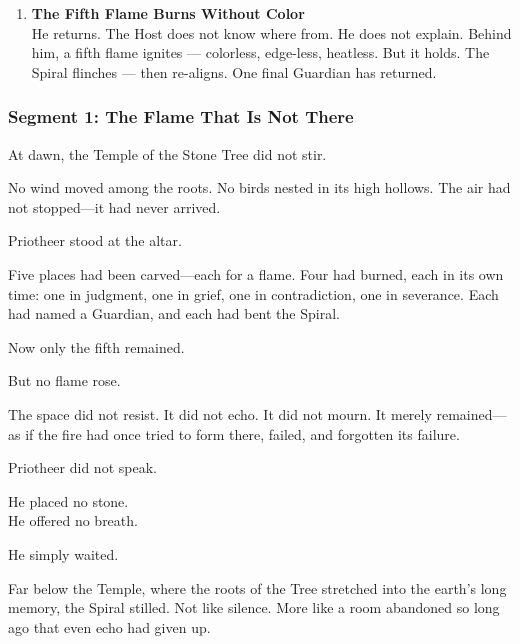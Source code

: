 \documentclass[9pt]{article}
\begin{document}
\begin{enumerate}
    \vspace{1em}
    \item \textbf{The Fifth Flame Burns Without Color} \\
    He returns. The Host does not know where from. He does not explain. Behind him, a fifth flame ignites — colorless, edge-less, heatless. But it holds. The Spiral flinches — then re-aligns. One final Guardian has returned.
\end{enumerate}

\newpage

\subsubsection*{Segment 1: The Flame That Is Not There}

At dawn, the Temple of the Stone Tree did not stir.

\vspace{0.5em}
No wind moved among the roots. No birds nested in its high hollows. The air had not stopped---it had never arrived.

\vspace{0.5em}
Priotheer stood at the altar.

\vspace{0.5em}
Five places had been carved---each for a flame. Four had burned, each in its own time: one in judgment, one in grief, one in contradiction, one in severance. Each had named a Guardian, and each had bent the Spiral.

\vspace{0.5em}
Now only the fifth remained.

\vspace{0.5em}
But no flame rose.

\vspace{0.5em}
The space did not resist. It did not echo. It did not mourn. It merely remained---as if the fire had once tried to form there, failed, and forgotten its failure.

\vspace{0.5em}
Priotheer did not speak.

\vspace{0.5em}
He placed no stone.\\
He offered no breath.

\vspace{0.5em}
He simply waited.

\vspace{0.5em}
Far below the Temple, where the roots of the Tree stretched into the earth’s long memory, the Spiral stilled. Not like silence. More like a room abandoned so long ago that even echo had given up.
\end{document}
